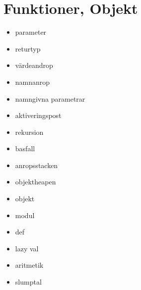 \chapter{Funktioner, Objekt}
\begin{itemize}[nosep]
\item parameter
\item returtyp
\item värdeandrop
\item namnanrop
\item namngivna parametrar
\item aktiveringspost
\item rekursion
\item basfall
\item anropsstacken
\item objektheapen
\item objekt
\item modul
\item def
\item lazy val
\item aritmetik
\item slumptal\end{itemize}